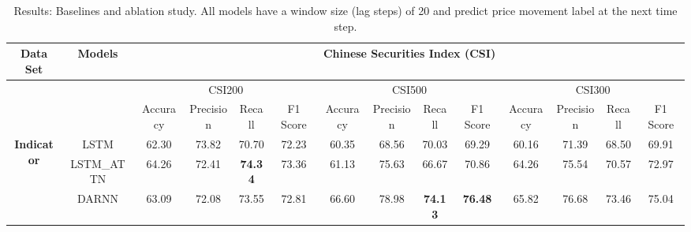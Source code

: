 \documentclass[sigconf,anonymous,review]{acmart}
\begin{document}
\begin{table}[t]
\centering
\small
\setlength\tabcolsep{2pt}
\caption{Results: Baselines and ablation study. All models have a
  window size (lag steps) of 20 and predict price movement label
  at the next time step.}
\begin{tabular}{@{}cccccccccccccc@{}}
\toprule
Data Set                   & Models                          & \multicolumn{12}{c}{Chinese Securities Index (CSI)}                                                                                                                                                                                                    \\ \midrule
\multicolumn{2}{c}{\multirow{2}{*}{}}                        & \multicolumn{4}{c}{CSI200}                                                                & \multicolumn{4}{c}{CSI500}                                                             & \multicolumn{4}{c}{CSI300}                                        \\
\multicolumn{2}{c}{}                                         & Accuracy                   & Precision      & Recall         & F1 Score                   & Accuracy       & Precision      & Recall         & F1 Score                            & Accuracy       & Precision      & Recall         & F1 Score       \\ \cmidrule(r){1-2} \cmidrule(lr){4-5} \cmidrule(lr){8-9} \cmidrule(lr){12-13}
\multirow{3}{*}{\textbf{Indicator}} & LSTM                            & 62.30                      & 73.82          & 70.70          & 72.23                      & 60.35          & 68.56          & 70.03          & 69.29                               & 60.16          & 71.39          & 68.50          & 69.91          \\
                           & \multicolumn{1}{c|}{LSTM\_ATTN} & 64.26                      & 72.41          & \textbf{74.34} & \multicolumn{1}{c|}{73.36} & 61.13          & 75.63          & 66.67          & \multicolumn{1}{c|}{70.86}          & 64.26          & 75.54          & 70.57          & 72.97          \\
                           & DARNN                           & 63.09 & 72.08          & 73.55          & 72.81                      & 66.60          & 78.98          & \textbf{74.13}          & \textbf{76.48}                               & 65.82          & 76.68          & 73.46          & 75.04          \\ \cmidrule(r){1-2} \cmidrule(lr){4-5} \cmidrule(lr){8-9} \cmidrule(lr){12-13}

\end{tabular}
\end{table}
\end{document}
